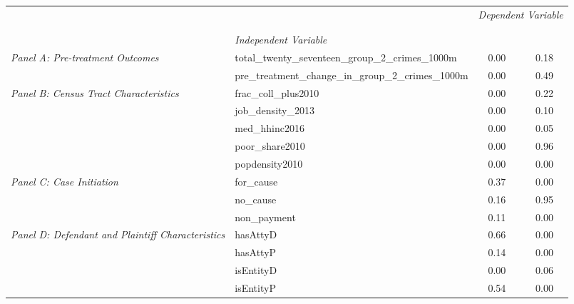 \begin{tabular}{llcc}
\toprule
 &  & \multicolumn{2}{c}{\textit{Dependent Variable}} \\
\cline{3-4}
\\
 &  &  &  \\
 & \emph{Independent Variable} &  &  \\
\midrule
\multirow[c]{2}{3cm}{\textit{Panel A: Pre-treatment Outcomes}} & total_twenty_seventeen_group_2_crimes_1000m & 0.00 & 0.18 \\
 & pre_treatment_change_in_group_2_crimes_1000m & 0.00 & 0.49 \\
\cline{1-4}
\multirow[c]{5}{3cm}{\textit{Panel B: Census Tract Characteristics}} & frac_coll_plus2010 & 0.00 & 0.22 \\
 & job_density_2013 & 0.00 & 0.10 \\
 & med_hhinc2016 & 0.00 & 0.05 \\
 & poor_share2010 & 0.00 & 0.96 \\
 & popdensity2010 & 0.00 & 0.00 \\
\cline{1-4}
\multirow[c]{3}{3cm}{\textit{Panel C: Case Initiation}} & for_cause & 0.37 & 0.00 \\
 & no_cause & 0.16 & 0.95 \\
 & non_payment & 0.11 & 0.00 \\
\cline{1-4}
\multirow[c]{4}{3cm}{\textit{Panel D: Defendant and Plaintiff Characteristics}} & hasAttyD & 0.66 & 0.00 \\
 & hasAttyP & 0.14 & 0.00 \\
 & isEntityD & 0.00 & 0.06 \\
 & isEntityP & 0.54 & 0.00 \\
\cline{1-4}
\bottomrule
\end{tabular}
